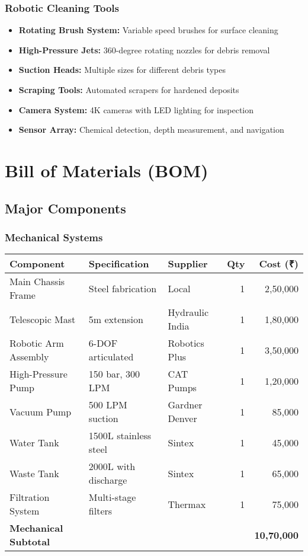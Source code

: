 \documentclass[11pt,a4paper]{article}
\begin{document}
\subsubsection{Robotic Cleaning Tools}
\begin{itemize}[leftmargin=2em]
    \item \textbf{Rotating Brush System:} Variable speed brushes for surface cleaning
    \item \textbf{High-Pressure Jets:} 360-degree rotating nozzles for debris removal
    \item \textbf{Suction Heads:} Multiple sizes for different debris types
    \item \textbf{Scraping Tools:} Automated scrapers for hardened deposits
    \item \textbf{Camera System:} 4K cameras with LED lighting for inspection
    \item \textbf{Sensor Array:} Chemical detection, depth measurement, and navigation
\end{itemize}

\section{Bill of Materials (BOM)}

\subsection{Major Components}

\subsubsection{Mechanical Systems}
\begin{center}
\small
\begin{tabular}{lllrr}
\toprule
\textbf{Component} & \textbf{Specification} & \textbf{Supplier} & \textbf{Qty} & \textbf{Cost (₹)} \\
\midrule
Main Chassis Frame & Steel fabrication & Local & 1 & 2,50,000 \\
Telescopic Mast & 5m extension & Hydraulic India & 1 & 1,80,000 \\
Robotic Arm Assembly & 6-DOF articulated & Robotics Plus & 1 & 3,50,000 \\
High-Pressure Pump & 150 bar, 300 LPM & CAT Pumps & 1 & 1,20,000 \\
Vacuum Pump & 500 LPM suction & Gardner Denver & 1 & 85,000 \\
Water Tank & 1500L stainless steel & Sintex & 1 & 45,000 \\
Waste Tank & 2000L with discharge & Sintex & 1 & 65,000 \\
Filtration System & Multi-stage filters & Thermax & 1 & 75,000 \\
\midrule
\textbf{Mechanical Subtotal} & & & & \textbf{10,70,000} \\
\bottomrule
\end{tabular}
\end{center}
\end{document}
